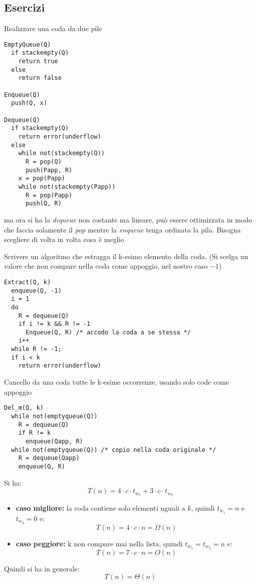 \documentclass[a4paper,12pt,oneside,tikz]{book}
\begin{document}
\subsection{Esercizi}
\begin{esercizio}
	Realizzare una coda da due pile
	\begin{verbatim}
EmptyQueue(Q)
  if stackempty(Q)
    return true
  else
    return false
    
Enqueue(Q)
  push(Q, x)
  
Dequeue(Q)
  if stackempty(Q)
    return error(underflow)
  else
    while not(stackempty(Q))
      R = pop(Q)
      push(Papp, R)
    x = pop(Papp)
    while not(stackempty(Papp))
      R = pop(Papp)
      push(Q, R)
\end{verbatim}
	ma ora si ha la \textit{dequeue} non costante ma lineare, può essere ottimizzata in modo che faccia solamente il \textit{pop} mentre la \textit{enqueue} tenga ordinata la pila. Bisogna scegliere di volta in volta cosa è meglio
\end{esercizio}
\newpage
\begin{esercizio}
	Scrivere un algoritmo che estragga il k-esimo elemento della coda. (Si scelga un valore che non compare nella coda come appoggio, nel nostro caso $-1$)
	\begin{verbatim}
Extract(Q, k)
  enqueue(Q, -1)
  i = 1
  do
    R = dequeue(Q) 
    if i != k && R != -1
      Enqueue(Q, R) /* accodo la coda a se stessa */
    i++
  while R != -1;
  if i < k
    return error(underflow)
\end{verbatim}
\end{esercizio}
\begin{esercizio}
	Cancello da una coda tutte le k-esime occorrenze, usando solo code come appoggio
	\begin{verbatim}
Del_m(Q, k)
  while not(emptyqueue(Q))
    R = dequeue(Q)
    if R != k
      enqueue(Qapp, R)
  while not(emptyqueue(Q)) /* copio nella coda originale */
    R = dequeue(Qapp)
    enqueue(Q, R)
\end{verbatim}
	Si ha:
	$$T(n)=4\cdot c\cdot t_{w_1}+3\cdot c\cdot t_{w_2}$$
	\begin{itemize}
		\item \textbf{caso migliore:} la coda contiene solo elementi uguali a $k$, quindi $t_{w_1}=n$ e $t_{w_2}=0$ e:
		      $$T(n)=4\cdot c\cdot n=\Omega(n)$$
		\item \textbf{caso peggiore:} k non compare mai nella lista, quindi $t_{w_1}=t_{w_2}=n$ e:
		      $$T(n)=7\cdot c\cdot n=O(n)$$
	\end{itemize}
	Quindi si ha in generale:
	$$T(n)=\Theta(n)$$
\end{esercizio}
\end{document}
